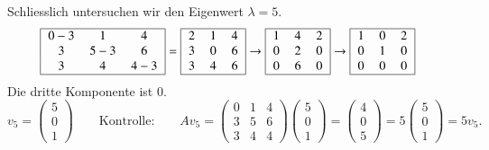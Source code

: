 Schliesslich untersuchen wir den Eigenwert $\lambda=5$.
\begin{align*}
\begin{tabular}{|>{$}c<{$}>{$}c<{$}>{$}c<{$}|}
\hline
0-3&1&4\\
3&5-3&6\\
3&4&4-3\\
\hline
\end{tabular}
&=
\begin{tabular}{|>{$}c<{$}>{$}c<{$}>{$}c<{$}|}
\hline
2&1&4\\
3&0&6\\
3&4&6\\
\hline
\end{tabular}
\rightarrow
\begin{tabular}{|>{$}c<{$}>{$}c<{$}>{$}c<{$}|}
\hline
1&4&2\\
0&2&0\\
0&6&0\\
\hline
\end{tabular}
\rightarrow
\begin{tabular}{|>{$}c<{$}>{$}c<{$}>{$}c<{$}|}
\hline
1&0&2\\
0&1&0\\
0&0&0\\
\hline
\end{tabular}
\end{align*}
Die dritte Komponente ist $0$.
\[
v_5
=
\begin{pmatrix}5\\0\\1\end{pmatrix}
\qquad\text{Kontrolle:}\qquad
Av_5
=
\begin{pmatrix}
0&1&4\\
3&5&6\\
3&4&4
\end{pmatrix}
\begin{pmatrix}5\\0\\1\end{pmatrix}
=
\begin{pmatrix}4\\0\\5\end{pmatrix}
=
5\begin{pmatrix}5\\0\\1\end{pmatrix}
=
5v_5.
\]








